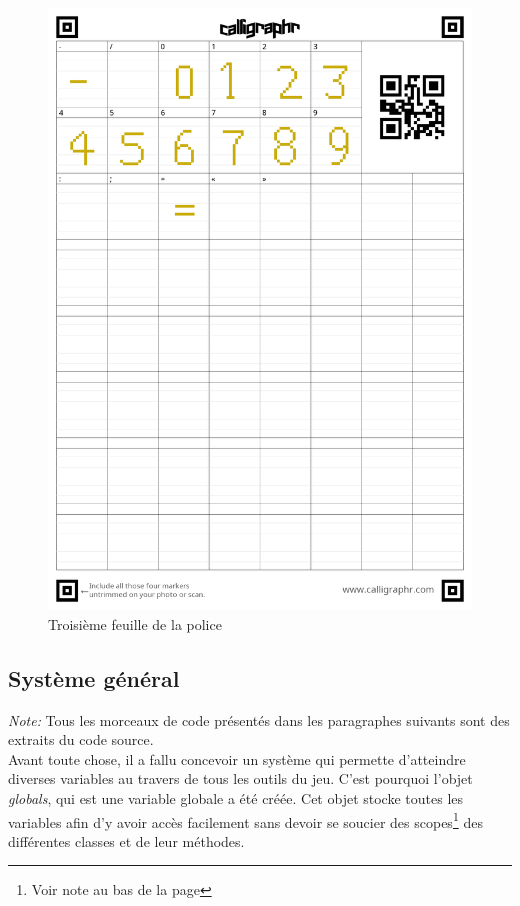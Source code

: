 \documentclass[11pt]{article}
\begin{document}
\begin{appendices}
\begin{figure}[H]
\includegraphics[scale=0.2]{fontPage3}
\caption{Troisième feuille de la police}
\end{figure}

\newpage
\subsection{Système général}
\textit{Note:} Tous les morceaux de code présentés dans les paragraphes suivants sont des extraits du code source.\\

	Avant toute chose, il a fallu concevoir un système qui permette d'atteindre diverses variables au travers de tous les outils du jeu. C'est pourquoi l'objet \textit{globals}, qui est une variable globale a été créée. Cet objet stocke toutes les variables afin d'y avoir accès facilement sans devoir se soucier des scopes\footnote{Voir note au bas de la page \pageref{scope}} des différentes classes et de leur méthodes.\\
 

\end{appendices}
\end{document}
